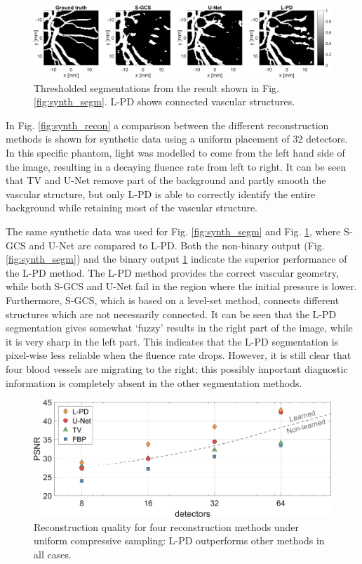 \documentclass[journal]{IEEEtran}
\begin{document}
{
\begin{figure}[ht!]
\centering
\includegraphics[width=0.8\linewidth]{images/paper_synthetic_segm_binary.png}
\caption{Thresholded segmentations from the result shown in Fig. \ref{fig:synth_segm}. L-PD shows connected vascular structures.}
\label{fig:synth_segm_binary}
\end{figure}
}

In Fig. \ref{fig:synth_recon} a comparison between the different reconstruction methods is shown for synthetic data using a uniform placement of 32 detectors. In this specific phantom, light was modelled to come from the left hand side of the image, resulting in a decaying fluence rate from left to right. It can be seen that TV and U-Net remove part of the background and partly smooth the vascular structure, but only L-PD is able to correctly identify the entire background while retaining most of the vascular structure. 

{The same synthetic data was used for Fig. \ref{fig:synth_segm} and Fig. \ref{fig:synth_segm_binary}, where S-GCS and U-Net are compared to L-PD. Both the non-binary output (Fig. \ref{fig:synth_segm}) and the binary output \ref{fig:synth_segm_binary} indicate the superior performance of the L-PD method. The L-PD method provides the correct vascular geometry, while both S-GCS and U-Net fail in the region where the initial pressure is lower. Furthermore, S-GCS, which is based on a level-set method, connects different structures which are not necessarily connected.} It can be seen that the L-PD segmentation gives somewhat `fuzzy' results in the right part of the image, while it is very sharp in the left part. This indicates that the L-PD segmentation is pixel-wise less reliable when the fluence rate drops. However, it is still clear that four blood vessels are migrating to the right; this possibly important diagnostic information is completely absent in the other segmentation methods.

\begin{figure}[ht!]
\centering
\includegraphics[width=\linewidth]{images/Paper_resultsuniform_PSNR.png}
\caption{Reconstruction quality for four reconstruction methods under uniform compressive sampling: L-PD outperforms other methods in all cases.}
\label{fig:PSNR_recon}
\vspace{-5mm}
\end{figure}
\end{document}
